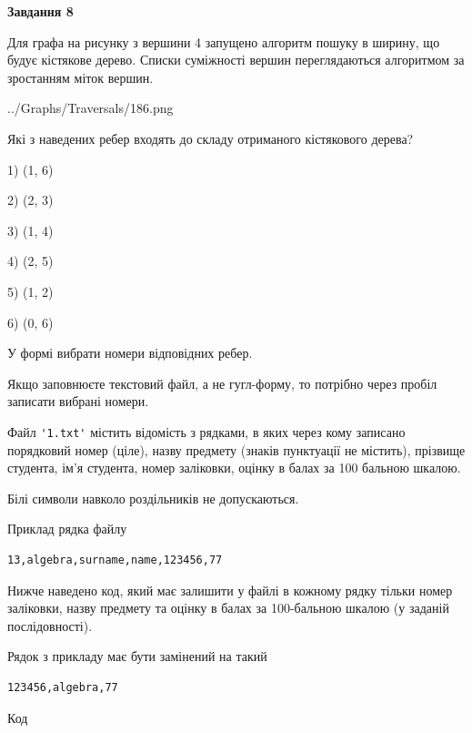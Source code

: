 \documentclass[12pt, ukrainian]{article}
\def\code#1{\Verb!#1!}
\begin{document}
{\begin {large}
{\begin {center}\textbf{Завдання 8}\end {center}}\par
Для графа на рисунку з вершини 4 запущено алгоритм пошуку в ширину, що будує кістякове дерево. Списки суміжності вершин переглядаються алгоритмом за зростанням міток вершин.\par
\begin{center}
	{../Graphs/Traversals/186.png}
\end{center}
\par Які з наведених ребер входять до складу отриманого кістякового дерева?\par
1) (1, 6)\par
2) (2, 3)\par
3) (1, 4)\par
4) (2, 5)\par
5) (1, 2)\par
6) (0, 6)\par
{\vskip 15pt} У формі вибрати номери відповідних ребер.


Якщо заповнюєте текстовий файл, а не гугл-форму, то потрібно через пробіл записа\-ти вибрані номери.\par
\newpage


Файл \code{'1.txt'} містить відомість з рядками, в яких через кому записа\-но поряд\-ковий номер (ціле), назву предмету (знаків пунктуації не містить), прізвище студента, ім'я студента, номер заліковки, оцінку в балах за 100 бальною шкалою.

Білі символи навколо роздільників не допускаються.

Приклад рядка файлу



\begin{verbatim}
13,algebra,surname,name,123456,77
\end{verbatim}


Нижче наведено код, який має залишити у файлі в кожному рядку тільки номер заліковки, назву предмету та оцінку в балах за 100-бальною шкалою (у заданій послі\-дов\-ності).

Рядок з прикладу має бути замінений на такий



\begin{verbatim}
123456,algebra,77
\end{verbatim}




Код




\end{large}}
\end{document}
